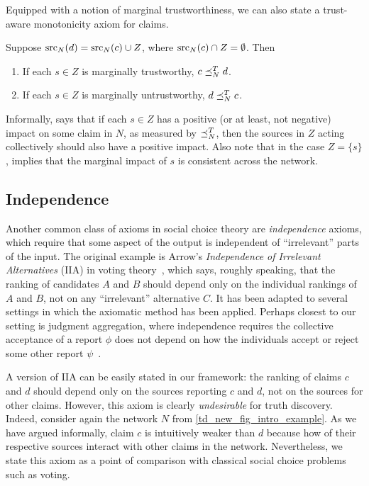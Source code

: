 Equipped with a notion of marginal trustworthiness, we can also state a
trust-aware monotonicity axiom for claims.

\begin{axiom}[\trustbasedmon{}]
    Suppose $\operatorname{src}_N(d) = \operatorname{src}_N(c) \cup Z$, where $\operatorname{src}_N(c) \cap Z =
    \emptyset$. Then
    \begin{enumerate}
        \item If each $s \in Z$ is marginally trustworthy, $c \preceq_N^T d$.
        \item If each $s \in Z$ is marginally untrustworthy, $d \preceq_N^T c$.
    \end{enumerate}
\end{axiom}

Informally, \trustbasedmon{} says that if each $s \in Z$ has a positive (or at
least, not negative) impact on some claim in $N$, as measured by $\preceq_N^T$,
then the sources in $Z$ acting collectively should also have a positive impact.
Also note that in the case $Z = \{s\}$, \trustbasedmon{} implies that the
marginal impact of $s$ is consistent across the network.

\subsection{Independence}
\label{td_new_sec_independence}

Another common class of axioms in social choice theory are \emph{independence}
axioms, which require that some aspect of the output is independent of
``irrelevant'' parts of the input. The original example is Arrow's
\emph{Independence of Irrelevant Alternatives} (IIA) in voting
theory~\cite{arrow1952}, which says, roughly speaking, that the ranking of
candidates $A$ and $B$ should depend only on the individual rankings of $A$ and
$B$, not on any ``irrelevant'' alternative $C$. It has been adapted to several
settings in which the axiomatic method has been applied. Perhaps closest to our
setting is judgment aggregation, where independence requires the collective
acceptance of a report $\phi$ does not depend on how the individuals accept or
reject some other report $\psi$~\cite{endriss2016ja}.

A version of IIA can be easily stated in our framework: the ranking of claims
$c$ and $d$ should depend only on the sources reporting $c$ and $d$, not on the
sources for other claims. However, this axiom is clearly \emph{undesirable} for
truth discovery. Indeed, consider again the network $N$ from
\cref{td_new_fig_intro_example}. As we have argued informally, claim $c$ is
intuitively weaker than $d$ because how of their respective sources interact
with other claims in the network. Nevertheless, we state this axiom as a point
of comparison with classical social choice problems such as voting.


